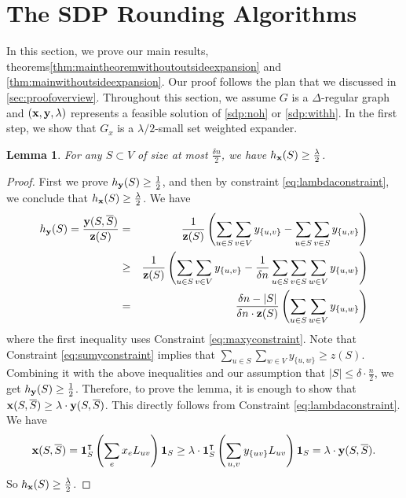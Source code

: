 \documentclass[11pt]{article}
\def\bone{{\bf 1}}
\def\bx{{\bf x}}
\def\by{{\bf y}}
\def\bz{{\bf z}}
\def\h{h}
\newtheorem{lemma}{Lemma}[section]
\begin{document}
\section{The SDP Rounding Algorithms}
\label{sec:sdprounding}
In this section, we prove our main results, theorems\ref{thm:maintheoremwithoutoutsideexpansion} and \ref{thm:mainwithoutsideexpansion}. 
Our proof follows the  plan that we discussed in \autoref{sec:proofoverview}.
Throughout this section, we assume $G$ is a $\Delta$-regular graph and $(\bx,\by,\lambda)$ represents a feasible solution of \ref{sdp:noh} or \ref{sdp:withh}. 
In the first step, we show that $G_x$ is a $\lambda/2$-small set weighted expander.
\begin{lemma}
\label{lem:expandingsmallsets}
For any $S \subset V$ of size at most $\frac{\delta n}{2}$, we have $\h_\bx(S) \geq \frac{\lambda}{2}$.
\end{lemma}
\begin{proof}
First we prove  $h_\by(S) \geq \frac{1}{2}$, and then by  constraint \eqref{eq:lambdaconstraint}, we conclude that $\h_\bx(S) \geq \frac{\lambda}{2}$.
We have 
\begin{eqnarray*}
h_\by(S)  =   \frac{\by(S,\overline{S})}{\bz(S)} &=&  \frac{1}{\bz(S)}\left(\sum_{ 
u \in S} \sum_{ v \in V} y_{\{u,v\}} - \sum_{u \in S} \sum_{v \in S} y_{\{u,v\}}\right) \\
&\geq &  \frac{1}{\bz(S)} \left(\sum_{u\in S}\sum_{ v  \in V} y_{\{u,v\}} - 
\frac{1}{\delta n} \sum_{u \in S}\sum_{v  \in S} \sum_{w \in V}  y_{\{u,w\}} \right) \\
&=& \frac{\delta n-|S|}{\delta n\cdot \bz(S)} \left(\sum_{u 
\in S}\sum_{w \in V} y_{ \{ u,w \} } \right) \end{eqnarray*}
where the first inequality uses  Constraint \eqref{eq:maxyconstraint}. 
Note that Constraint \eqref{eq:sumyconstraint} implies that $\sum_{u \in S} \sum_{w \in V} y_{\{u,w\}} \geq z(S)$. Combining it with the above inequalities and our assumption that $|S| \leq \delta\cdot \frac{n}{2}$, we get $h_\by(S) \geq \frac{1}{2}$. Therefore, to 
prove the lemma, it is enough to show that $\bx(S,\overline{S}) \geq 
\lambda\cdot \by(S,\overline{S})$. This directly follows from Constraint \eqref{eq:lambdaconstraint}. We have 
\begin{eqnarray} \bx(S,\overline{S}) =\bone_S^\intercal \left(\sum_{e} x_e L_{uv}\right)\bone_S   
\geq  \lambda \cdot \bone_S^\intercal \left(\sum_{u,v} y_{\{uv\}}L_{uv}\right)\bone_S = \lambda \cdot \by(S,\overline{S})
. 
\end{eqnarray}
So $\h_\bx(S) \geq \frac{\lambda}{2}$.
\end{proof}
\end{document}
